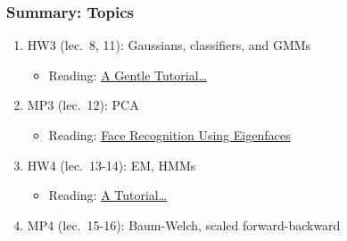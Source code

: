 \documentclass{beamer}
\begin{document}
\begin{frame}
  \frametitle{Summary: Topics}
  
  \begin{enumerate}
  \item HW3 (lec.~8, 11): Gaussians, classifiers, and GMMs
    \begin{itemize}
    \item Reading:
      \href{http://faculty.washington.edu/fxia/courses/LING572/EM_bilmes98.pdf}{\color{blue}A Gentle Tutorial\ldots}
    \end{itemize}
  \item MP3 (lec.~12): PCA
    \begin{itemize}
    \item Reading:
      \href{http://hans.fugal.net/comps/papers/turk_1991.pdf}{\color{blue}Face Recognition Using Eigenfaces}
    \end{itemize}
  \item HW4 (lec.~13-14): EM, HMMs
    \begin{itemize}
    \item Reading:
      \href{https://ieeexplore.ieee.org/document/18626?arnumber=18626}{\color{blue}A Tutorial\ldots}
    \end{itemize}
  \item MP4 (lec.~15-16): Baum-Welch, scaled forward-backward
  \end{enumerate}
\end{frame}
\end{document}
